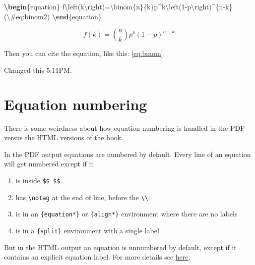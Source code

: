 \documentclass[]{book}
\newenvironment{Shaded}{\begin{snugshade}}{\end{snugshade}}
\newcommand{\ExtensionTok}[1]{#1}
\newcommand{\KeywordTok}[1]{\textcolor[rgb]{0.13,0.29,0.53}{\textbf{#1}}}
\newcommand{\NormalTok}[1]{#1}
\newcommand{\SpecialCharTok}[1]{\textcolor[rgb]{0.00,0.00,0.00}{#1}}
\newcommand{\SpecialStringTok}[1]{\textcolor[rgb]{0.31,0.60,0.02}{#1}}
\providecommand{\tightlist}{%
  \setlength{\itemsep}{0pt}\setlength{\parskip}{0pt}}
\begin{document}
\begin{Shaded}
\begin{Highlighting}[]
\KeywordTok{\textbackslash{}begin}\NormalTok{\{}\ExtensionTok{equation}\NormalTok{\}}
\SpecialStringTok{f}\SpecialCharTok{\textbackslash{}left}\SpecialStringTok{(k}\SpecialCharTok{\textbackslash{}right}\SpecialStringTok{)=}\SpecialCharTok{\textbackslash{}binom}\SpecialStringTok{\{n\}\{k\}p^k}\SpecialCharTok{\textbackslash{}left}\SpecialStringTok{(1-p}\SpecialCharTok{\textbackslash{}right}\SpecialStringTok{)^\{n-k\} (}\SpecialCharTok{\textbackslash{}#}\SpecialStringTok{eq:binom2)}
\KeywordTok{\textbackslash{}end}\NormalTok{\{}\ExtensionTok{equation}\NormalTok{\}}
\end{Highlighting}
\end{Shaded}

\begin{equation}
f\left(k\right)=\binom{n}{k}p^k\left(1-p\right)^{n-k} \label{eq:binom2}
\end{equation}

Then you can cite the equation, like this: \eqref{eq:binom}.

Changed this 5:11PM.

\hypertarget{equation-numbering}{%
\section{Equation numbering}\label{equation-numbering}}

There is some weirdness about how equation numbering is handled in the PDF versus the HTML versions of the book.

In the PDF output equations are numbered by default. Every line of an equation will get numbered except if it

\begin{enumerate}
\def\labelenumi{\arabic{enumi}.}
\tightlist
\item
  is inside \texttt{\$\$\ \$\$}.
\item
  has \texttt{\textbackslash{}notag} at the end of line, before the \texttt{\textbackslash{}\textbackslash{}}.
\item
  is in an \texttt{\{equation*\}} or \texttt{\{align*\}} environment where there are no labels
\item
  is in a \texttt{\{split\}} environment with a single label
\end{enumerate}

But in the HTML output an equation is unnumbered by default, except if it contains an explicit equation label. For more details see \href{https://bookdown.org/yihui/bookdown/markdown-extensions-by-bookdown.html}{here}.
\end{document}
